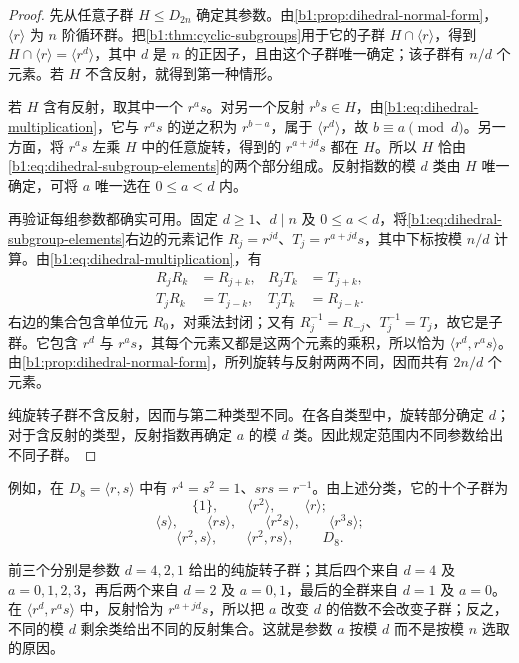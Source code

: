 \begin{proof}
	先从任意子群 \(H\leq D_{2n}\) 确定其参数。由\cref{b1:prop:dihedral-normal-form}，\(\langle r\rangle\) 为 \(n\) 阶循环群。把\cref{b1:thm:cyclic-subgroups}用于它的子群 \(H\cap\langle r\rangle\)，得到 \(H\cap\langle r\rangle=\langle r^d\rangle\)，其中 \(d\) 是 \(n\) 的正因子，且由这个子群唯一确定；该子群有 \(n/d\) 个元素。若 \(H\) 不含反射，就得到第一种情形。

	若 \(H\) 含有反射，取其中一个 \(r^as\)。对另一个反射 \(r^bs\in H\)，由\eqref{b1:eq:dihedral-multiplication}，它与 \(r^as\) 的逆之积为 \(r^{b-a}\)，属于 \(\langle r^d\rangle\)，故 \(b\equiv a\pmod d\)。另一方面，将 \(r^as\) 左乘 \(H\) 中的任意旋转，得到的 \(r^{a+jd}s\) 都在 \(H\)。所以 \(H\) 恰由\eqref{b1:eq:dihedral-subgroup-elements}的两个部分组成。反射指数的模 \(d\) 类由 \(H\) 唯一确定，可将 \(a\) 唯一选在 \(0\leq a<d\) 内。

	再验证每组参数都确实可用。固定 \(d\geq1\)、\(d\mid n\) 及 \(0\leq a<d\)，将\eqref{b1:eq:dihedral-subgroup-elements}右边的元素记作 \(R_j=r^{jd}\)、\(T_j=r^{a+jd}s\)，其中下标按模 \(n/d\) 计算。由\eqref{b1:eq:dihedral-multiplication}，有
	\[
		\begin{aligned}
			R_jR_k&=R_{j+k},& R_jT_k&=T_{j+k},\\
			T_jR_k&=T_{j-k},& T_jT_k&=R_{j-k}.
		\end{aligned}
	\]
	右边的集合包含单位元 \(R_0\)，对乘法封闭；又有 \(R_j^{-1}=R_{-j}\)、\(T_j^{-1}=T_j\)，故它是子群。它包含 \(r^d\) 与 \(r^as\)，其每个元素又都是这两个元素的乘积，所以恰为 \(\langle r^d,r^as\rangle\)。由\cref{b1:prop:dihedral-normal-form}，所列旋转与反射两两不同，因而共有 \(2n/d\) 个元素。

	纯旋转子群不含反射，因而与第二种类型不同。在各自类型中，旋转部分确定 \(d\)；对于含反射的类型，反射指数再确定 \(a\) 的模 \(d\) 类。因此规定范围内不同参数给出不同子群。
\end{proof}

\begin{samepage}
	例如，在 \(D_8=\langle r,s\rangle\) 中有 \(r^4=s^2=1\)、\(srs=r^{-1}\)。由上述分类，它的十个子群为
	\[
		\{1\},\qquad \langle r^2\rangle,\qquad \langle r\rangle;
	\]
	\[
		\langle s\rangle,\qquad \langle rs\rangle,\qquad \langle r^2s\rangle,\qquad \langle r^3s\rangle;
	\]
	\[
		\langle r^2,s\rangle,\qquad \langle r^2,rs\rangle,\qquad D_8.
	\]
\end{samepage}
前三个分别是参数 \(d=4,2,1\) 给出的纯旋转子群；其后四个来自 \(d=4\) 及 \(a=0,1,2,3\)，再后两个来自 \(d=2\) 及 \(a=0,1\)，最后的全群来自 \(d=1\) 及 \(a=0\)。在 \(\langle r^d,r^as\rangle\) 中，反射恰为 \(r^{a+jd}s\)，所以把 \(a\) 改变 \(d\) 的倍数不会改变子群；反之，不同的模 \(d\) 剩余类给出不同的反射集合。这就是参数 \(a\) 按模 \(d\) 而不是按模 \(n\) 选取的原因。

